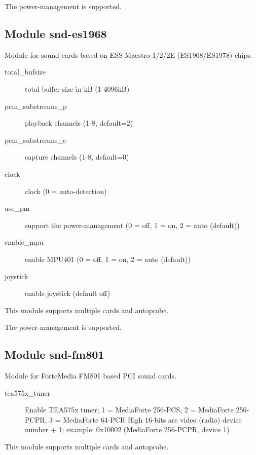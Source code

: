 \documentclass[a4paper,8pt,english]{sphinxmanual}
\begin{document}
The power-management is supported.


\subsection{Module snd-es1968}
\label{sound/alsa-configuration:module-snd-es1968}
Module for sound cards based on ESS Maestro-1/2/2E (ES1968/ES1978) chips.
\begin{description}
\item[{total\_bufsize}] \leavevmode
total buffer size in kB (1-4096kB)

\item[{pcm\_substreams\_p}] \leavevmode
playback channels (1-8, default=2)

\item[{pcm\_substreams\_c}] \leavevmode
capture channels (1-8, default=0)

\item[{clock}] \leavevmode
clock (0 = auto-detection)

\item[{use\_pm}] \leavevmode
support the power-management (0 = off, 1 = on, 2 = auto (default))

\item[{enable\_mpu}] \leavevmode
enable MPU401 (0 = off, 1 = on, 2 = auto (default))

\item[{joystick}] \leavevmode
enable joystick (default off)

\end{description}

This module supports multiple cards and autoprobe.

The power-management is supported.


\subsection{Module snd-fm801}
\label{sound/alsa-configuration:module-snd-fm801}
Module for ForteMedia FM801 based PCI sound cards.
\begin{description}
\item[{tea575x\_tuner}] \leavevmode
Enable TEA575x tuner;
1 = MediaForte 256-PCS,
2 = MediaForte 256-PCPR,
3 = MediaForte 64-PCR
High 16-bits are video (radio) device number + 1;
example: 0x10002 (MediaForte 256-PCPR, device 1)

\end{description}

This module supports multiple cards and autoprobe.
\end{document}

